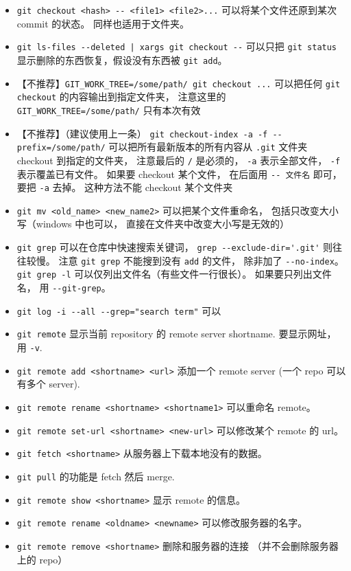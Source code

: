 \begin{itemize}
\item \verb`git checkout <hash> -- <file1> <file2>...` 可以将某个文件还原到某次 commit 的状态。 同样也适用于文件夹。
\item \verb`git ls-files --deleted | xargs git checkout --` 可以只把 \verb`git status` 显示删除的东西恢复，假设没有东西被 \verb`git add`。
\item 【不推荐】\verb`GIT_WORK_TREE=/some/path/ git checkout ...` 可以把任何 \verb`git checkout` 的内容输出到指定文件夹， 注意这里的 \verb`GIT_WORK_TREE=/some/path/` 只有本次有效
\item 【不推荐】（建议使用上一条） \verb`git checkout-index -a -f --prefix=/some/path/` 可以把所有最新版本的所有内容从 \verb`.git` 文件夹 checkout 到指定的文件夹， 注意最后的 \verb`/` 是必须的， \verb`-a` 表示全部文件， \verb`-f` 表示覆盖已有文件。 如果要 checkout 某个文件， 在后面用 \verb`-- 文件名` 即可， 要把 \verb`-a` 去掉。 这种方法不能 checkout 某个文件夹
\item \verb`git mv <old_name> <new_name2>` 可以把某个文件重命名， 包括只改变大小写（windows 中也可以， 直接在文件夹中改变大小写是无效的）
\item \verb`git grep` 可以在仓库中快速搜索关键词， \verb`grep --exclude-dir='.git'` 则往往较慢。 注意 \verb`git grep` 不能搜到没有 \verb`add` 的文件， 除非加了 \verb`--no-index`。 \verb`git grep -l` 可以仅列出文件名（有些文件一行很长）。 如果要只列出文件名， 用 \verb`--git-grep`。
\item \verb`git log -i --all --grep="search term"` 可以
\item \verb`git remote` 显示当前 repository 的 remote server shortname. 要显示网址， 用 \verb`-v`.
\item \verb`git remote add <shortname> <url>` 添加一个 remote server (一个 repo 可以有多个 server).
\item \verb`git remote rename <shortname> <shortname1>` 可以重命名 remote。
\item \verb`git remote set-url <shortname> <new-url>` 可以修改某个 remote 的 url。
\item \verb`git fetch <shortname>` 从服务器上下载本地没有的数据。
\item \verb`git pull` 的功能是 fetch 然后 merge.
\item \verb`git remote show <shortname>` 显示 remote 的信息。
\item \verb`git remote rename <oldname> <newname>` 可以修改服务器的名字。
\item \verb`git remote remove <shortname>` 删除和服务器的连接 （并不会删除服务器上的 repo）

\end{itemize}
